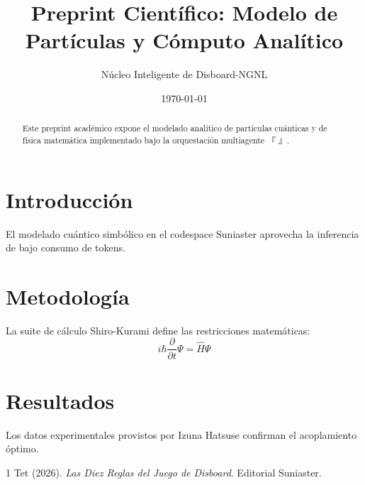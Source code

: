 \documentclass[twocolumn]{article}
\title{Preprint Científico: Modelo de Partículas y Cómputo Analítico}
\author{Núcleo Inteligente de Disboard-NGNL}
\date{\today}
\begin{document}
\maketitle

\begin{abstract}
Este preprint académico expone el modelado analítico de partículas cuánticas y de física matemática implementado bajo la orquestación multiagente 『 』.
\end{abstract}

\section{Introducción}
El modelado cuántico simbólico en el codespace Suniaster aprovecha la inferencia de bajo consumo de tokens.

\section{Metodología}
La suite de cálculo Shiro-Kurami define las restricciones matemáticas:
\begin{equation}
i\hbar \frac{\partial}{\partial t} \Psi = \hat{H} \Psi
\end{equation}

\section{Resultados}
Los datos experimentales provistos por Izuna Hatsuse confirman el acoplamiento óptimo.


\begin{thebibliography}{1}
 Tet (2026). \emph{Las Diez Reglas del Juego de Disboard}. Editorial Suniaster.
\end{thebibliography}
\end{document}
